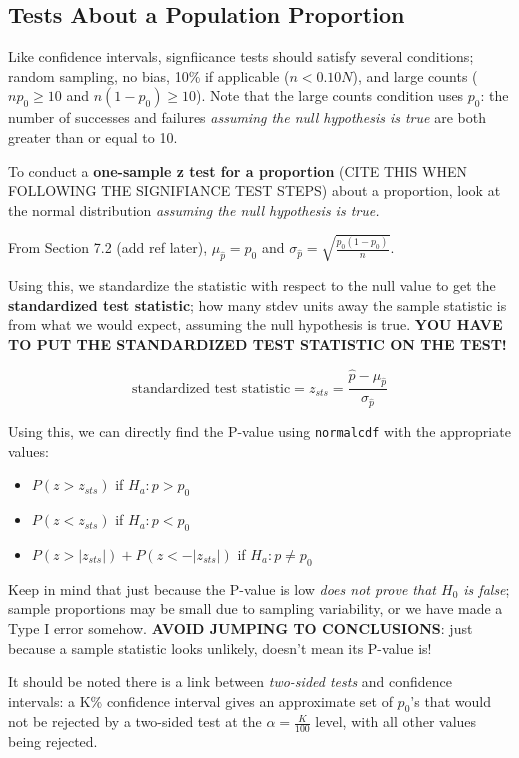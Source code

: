 \documentclass[12pt, a4paper]{article}
\theoremstyle{definition}
\begin{document}
\subsection{Tests About a Population Proportion}

Like confidence intervals, signfiicance tests should satisfy several conditions; random sampling, no bias, 10\% if applicable ($n < 0.10N$), and large counts ($np_0 \geq 10$ and $n(1-p_0) \geq 10$).
Note that the large counts condition uses $p_0$: the number of successes and failures \textit{assuming the null hypothesis is true} are both greater than or equal to 10.

To conduct a \textbf{one-sample z test for a proportion} (CITE THIS WHEN FOLLOWING THE SIGNIFIANCE TEST STEPS) about a proportion, look at the normal distribution \textit{assuming the null hypothesis is true.}

From Section 7.2 (add ref later), $\mu_{\hat{p}} = p_0$ and $\sigma_{\hat{p}} = \sqrt{\frac{p_0(1-p_0)}{n}}$.

Using this, we standardize the statistic with respect to the null value to get the \textbf{standardized test statistic}; how many stdev units away the sample statistic is from what we would expect, assuming the null hypothesis is true.
\textbf{YOU HAVE TO PUT THE STANDARDIZED TEST STATISTIC ON THE TEST!}

\[\textrm{standardized test statistic} = z_{sts} = \frac{\hat{p} - \mu_{\hat{p}}}{\sigma_{\hat{p}}}\]

Using this, we can directly find the P-value using \verb|normalcdf| with the appropriate values:
\begin{itemize}
    \item $P(z > z_{sts})$ if $H_a : p > p_0$
    \item $P(z < z_{sts})$ if $H_a : p < p_0$
    \item $P(z > |z_{sts}|) + P(z < -|z_{sts}|)$ if $H_a : p \neq p_0$
\end{itemize}

Keep in mind that just because the P-value is low \textit{does not prove that $H_0$ is false}; sample proportions may be small due to sampling variability, or we have made a Type I error somehow. \textbf{AVOID JUMPING TO CONCLUSIONS}: just because a sample statistic looks unlikely, doesn't mean its P-value is!

It should be noted there is a link between \textit{two-sided tests} and confidence intervals: a K\% confidence interval gives an approximate set of $p_0$'s that would not be rejected by a two-sided test at the $\alpha = \frac{K}{100}$ level, with all other values being rejected.
\end{document}
